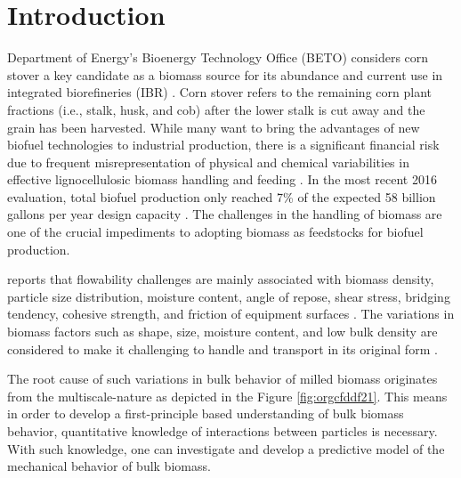 \documentclass[xcolor=dvipsnames,10pt,hidelinks]{article}
\begin{document}
\section{Introduction}
\label{sec:org1c78901}
Department of Energy's Bioenergy Technology Office (BETO) considers corn stover a key candidate as a biomass source for its abundance and current use in integrated biorefineries (IBR) \citep{doyle_integrated_2014,usdoe_u.s._2011,langholtz_2016_2016,perlack_us_2011}. Corn stover refers to the remaining corn plant fractions (i.e., stalk, husk, and cob) after the lower stalk is cut away and the grain has been harvested.
While many want to bring the advantages of new biofuel technologies to industrial production, there is a significant financial risk due to frequent misrepresentation of physical and chemical variabilities in effective lignocellulosic biomass handling and feeding \citep{crawford_effects_2016,ray_multiscale_2020,Ray_BiomassBlendingDensification_2017}.
In the most recent 2016 evaluation, total biofuel production only reached 7\% of the expected 58 billion gallons per year design capacity \citep{westover_biomass_2018}.
The challenges in the handling of biomass are one of the crucial impediments to adopting biomass as feedstocks for biofuel production.

\citet{beto_biorefinery_2016} reports that flowability challenges are mainly associated with biomass density, particle size distribution, moisture content, angle of repose, shear stress, bridging tendency, cohesive strength, and friction of equipment surfaces \citep{westover_biomass_2018}.
The variations in biomass factors such as shape, size, moisture content, and low bulk density are considered to make it challenging to handle and transport in its original form \citep{kaliyan_roll_2009}.

The root cause of such variations in bulk behavior of milled biomass originates from the multiscale-nature as depicted in the Figure \ref{fig:orgcfddf21}.
This means in order to develop a first-principle based understanding of bulk biomass behavior, quantitative knowledge of interactions between particles is necessary.
With such knowledge, one can investigate and develop a predictive model of the mechanical behavior of bulk biomass.
\end{document}
